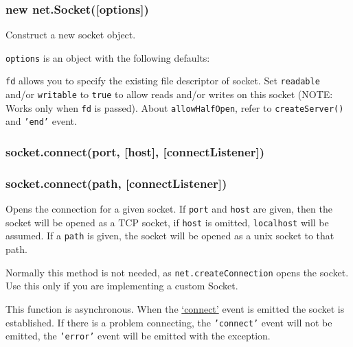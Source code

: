 \subsubsection{new
net.Socket({[}options{]})}\label{new-net.socketoptions}

Construct a new socket object.

\texttt{options} is an object with the following defaults:

\begin{Shaded}
\begin{Highlighting}[]
\NormalTok{\{ }\NormalTok{: }
  \NormalTok{: }\NormalTok{,}
  \NormalTok{: }\NormalTok{,}
  \NormalTok{: }
\NormalTok{\}}
\end{Highlighting}
\end{Shaded}

\texttt{fd} allows you to specify the existing file descriptor of
socket. Set \texttt{readable} and/or \texttt{writable} to \texttt{true}
to allow reads and/or writes on this socket (NOTE: Works only when
\texttt{fd} is passed). About \texttt{allowHalfOpen}, refer to
\texttt{createServer()} and \texttt{'end'} event.

\subsubsection{socket.connect(port, {[}host{]},
{[}connectListener{]})}\label{socket.connectport-host-connectlistener}

\subsubsection{socket.connect(path,
{[}connectListener{]})}\label{socket.connectpath-connectlistener}

Opens the connection for a given socket. If \texttt{port} and
\texttt{host} are given, then the socket will be opened as a TCP socket,
if \texttt{host} is omitted, \texttt{localhost} will be assumed. If a
\texttt{path} is given, the socket will be opened as a unix socket to
that path.

Normally this method is not needed, as \texttt{net.createConnection}
opens the socket. Use this only if you are implementing a custom Socket.

This function is asynchronous. When the
\hyperref[netux5feventux5fconnect]{`connect'} event is emitted the
socket is established. If there is a problem connecting, the
\texttt{'connect'} event will not be emitted, the \texttt{'error'} event
will be emitted with the exception.

